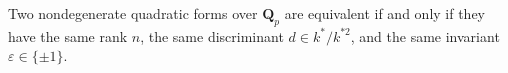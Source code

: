 Two nondegenerate quadratic forms over $\mathbf{Q}_p$ are equivalent if and only if they have the same rank $n$, the same discriminant $d \in k^*/k^{*2}$, and the same invariant $\varepsilon \in \{\pm 1\}$.
